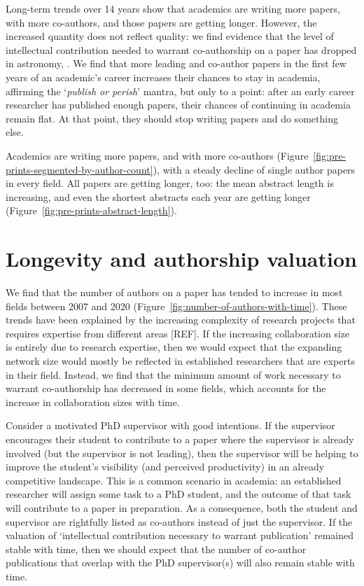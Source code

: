 	Long-term trends over 14 years show that academics are writing more papers, with more co-authors, and those papers are getting longer. 
	However, the increased quantity does not reflect quality: we find evidence that the level of intellectual contribution needed to warrant co-authorship on a paper has dropped in astronomy, . 
	We find that more leading and co-author papers in the first few years of an academic's career increases their chances to stay in academia, affirming the `\emph{publish or perish}' mantra, but only to a point: after an early career researcher has published enough papers, their chances of continuing in academia remain flat. At that point, they should stop writing papers and do something else.


Academics are writing more papers, and with more co-authors (Figure~\ref{fig:pre-prints-segmented-by-author-count}), with a steady decline of single author papers in every field. All papers are getting longer, too: the mean abstract length is increasing, and even the shortest abstracts each year are getting longer (Figure~\ref{fig:pre-prints-abstract-length}).




\section*{Longevity and authorship valuation}


We find that the number of authors on a paper has tended to increase in most fields between 2007 and 2020 (Figure~\ref{fig:number-of-authors-with-time}). These trends have been explained by the increasing complexity of research projects that requires expertise from different areas [REF]. If the increasing collaboration size is entirely due to research expertise, then we would expect that the expanding network size would mostly be reflected in established researchers that are experts in their field. Instead, we find that the minimum amount of work necessary to warrant co-authorship has decreased in some fields, which  accounts for the increase in collaboration sizes with time.

Consider a motivated PhD supervisor with good intentions. If the supervisor encourages their student to contribute to a paper where the supervisor is already involved (but the supervisor is not leading), then the supervisor will be helping to improve the student's visibility (and perceived productivity) in an already competitive landscape. This is a common scenario in academia: an established researcher will assign some task to a PhD student, and the outcome of that task will contribute to a paper in preparation. As a consequence, both the student and supervisor are rightfully listed as co-authors instead of just the supervisor. If the valuation of `intellectual contribution necessary to warrant publication' remained stable with time, then we should expect that the number of co-author publications that overlap with the PhD supervisor(s) will also remain stable with time.

